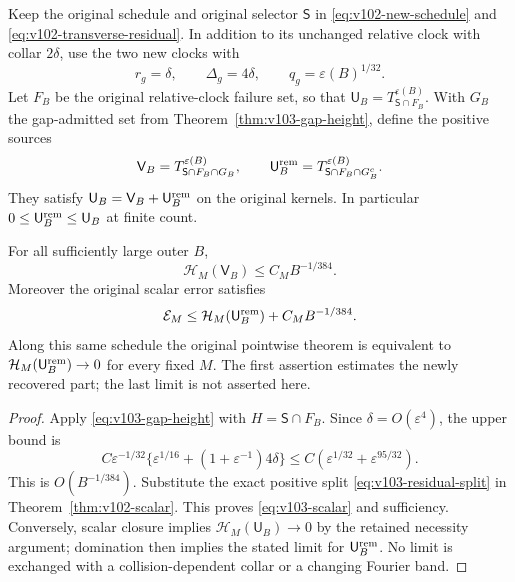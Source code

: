 Keep the original schedule and original selector $\mathsf S$ in
\eqref{eq:v102-new-schedule} and \eqref{eq:v102-transverse-residual}.
In addition to its unchanged relative clock with collar $2\delta$,
use the two new clocks with
\begin{equation}\label{eq:v103-schedule}
 r_g=\delta,\qquad\Delta_g=4\delta,\qquad
 q_g=\varepsilon(B)^{1/32}.
\end{equation}
Let $F_B$ be the original relative-clock failure set, so that
$\mathsf U_B=T_{\mathsf S\cap F_B}^{\varepsilon(B)}$.
With $G_B$ the gap-admitted set from Theorem~\ref{thm:v103-gap-height},
define the positive sources
\begin{equation}\label{eq:v103-residual-split}
 \mathsf V_B=T_{\mathsf S\cap F_B\cap G_B}^{\varepsilon(B)},
 \qquad
 \mathsf U_B^{\rm rem}
       =T_{\mathsf S\cap F_B\cap G_B^c}^{\varepsilon(B)}.
\end{equation}
They satisfy $\mathsf U_B=\mathsf V_B+\mathsf U_B^{\rm rem}$
on the original kernels. In particular
$0\le\mathsf U_B^{\rm rem}\le\mathsf U_B$ at finite count.

\begin{theorem}
\label{thm:v103-recovery}
For all sufficiently large outer $B$,
\begin{equation}\label{eq:v103-recovered}
 \mathcal H_M(\mathsf V_B)\le C_MB^{-1/384}.
\end{equation}
Moreover the original scalar error satisfies
\begin{equation}\label{eq:v103-scalar}
 \mathcal E_M\le\mathcal H_M(\mathsf U_B^{\rm rem})
                                      +C_MB^{-1/384}.
\end{equation}
Along this same schedule the original pointwise theorem is equivalent
to $\mathcal H_M(\mathsf U_B^{\rm rem})\to0$ for every fixed $M$.
The first assertion estimates the newly recovered part; the last
limit is not asserted here.
\end{theorem}
\begin{proof}
Apply \eqref{eq:v103-gap-height} with $H=\mathsf S\cap F_B$.
Since $\delta=O(\varepsilon^4)$, the upper bound is
\[
 C\varepsilon^{-1/32}
        \{\varepsilon^{1/16}+(1+\varepsilon^{-1})4\delta\}
 \le C(\varepsilon^{1/32}+\varepsilon^{95/32}).
\]
This is $O(B^{-1/384})$. Substitute the exact positive split
\eqref{eq:v103-residual-split} in Theorem~\ref{thm:v102-scalar}.
This proves \eqref{eq:v103-scalar} and sufficiency. Conversely,
scalar closure implies $\mathcal H_M(\mathsf U_B)\to0$ by the
retained necessity argument; domination then implies the stated
limit for $\mathsf U_B^{\rm rem}$. No limit is exchanged with a
collision-dependent collar or a changing Fourier band.
\end{proof}

